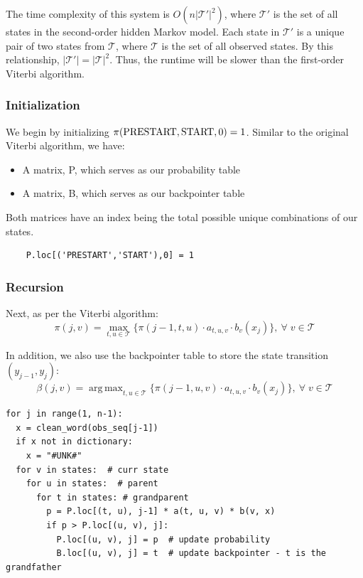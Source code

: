 \documentclass{article}
\DeclareMathOperator*{\argmax}{arg\,max}
\numberwithin{equation}{section}
\begin{document}
The time complexity of this system is $O(n|\mathcal{T}'|^2)$, where $\mathcal{T}'$ is the set of all states in the second-order hidden Markov model. Each state in $\mathcal{T}'$ is a unique pair of two states from $\mathcal{T}$, where $\mathcal{T}$ is the set of all observed states. By this relationship, $|\mathcal{T}'| = |\mathcal{T}|^2$. Thus, the runtime will be slower than the first-order Viterbi algorithm.

\subsubsection{Initialization}
We begin by initializing $\pi(\text{\lstinline{PRESTART}}, \text{\lstinline{START}}, 0) = 1$.
Similar to the original Viterbi algorithm, we have:
\begin{itemize}
	\item A matrix, P, which serves as our probability table
	\item A matrix, B, which serves as our backpointer table
\end{itemize}

Both matrices have an index being the total possible unique combinations of our states.

\begin{verbatim}
	P.loc[('PRESTART','START'),0] = 1
\end{verbatim}

\subsubsection{Recursion}
Next, as per the Viterbi algorithm:
	$$ \pi(j, v) = \max_{t, u\in\mathcal{T}} \{ \pi(j-1, t, u) \cdot a_{t, u, v} \cdot b_v(x_j) \}, \: \forall\; v \in \mathcal{T} $$

In addition, we also use the backpointer table to store the state transition $(y_{j-1}, y_j)$:
	$$\beta(j, v) = \argmax_{t, u\in\mathcal{T}} \{ \pi(j-1, u, v) \cdot a_{t, u, v} \cdot b_v(x_j) \}, \: \forall\; v \in \mathcal{T} $$

\begin{verbatim}
for j in range(1, n-1):
  x = clean_word(obs_seq[j-1])
  if x not in dictionary:
    x = "#UNK#"
  for v in states:  # curr state
    for u in states:  # parent
      for t in states: # grandparent
        p = P.loc[(t, u), j-1] * a(t, u, v) * b(v, x)
        if p > P.loc[(u, v), j]:
          P.loc[(u, v), j] = p  # update probability
          B.loc[(u, v), j] = t  # update backpointer - t is the grandfather
\end{verbatim}
\end{document}
